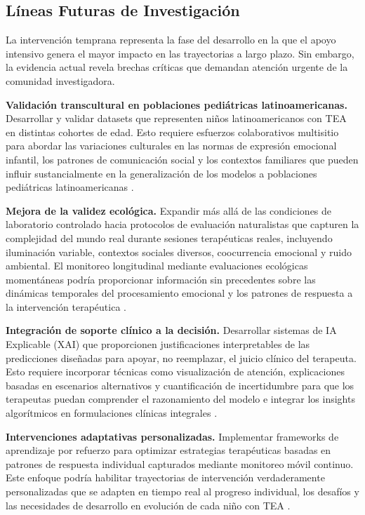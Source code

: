 \documentclass[ASNA,twocolumn]{USG}
\begin{document}
	\subsection{Líneas Futuras de Investigación}\label{sec7b}
	
	La intervención temprana representa la fase del desarrollo en la que el apoyo
	intensivo genera el mayor impacto en las trayectorias a largo plazo. Sin embargo,
	la evidencia actual revela brechas críticas que demandan atención urgente de la
	comunidad investigadora.
	
	\textbf{Validación transcultural en poblaciones pediátricas latinoamericanas.}
	Desarrollar y validar datasets que representen niños latinoamericanos con TEA en
	distintas cohortes de edad. Esto requiere esfuerzos colaborativos multisitio para
	abordar las variaciones culturales en las normas de expresión emocional infantil,
	los patrones de comunicación social y los contextos familiares que pueden influir
	sustancialmente en la generalización de los modelos a poblaciones pediátricas
	latinoamericanas \cite{Shaik2025,Washington2022}.
	
	\textbf{Mejora de la validez ecológica.} Expandir más allá de las condiciones de
	laboratorio controlado hacia protocolos de evaluación naturalistas que capturen la
	complejidad del mundo real durante sesiones terapéuticas reales, incluyendo
	iluminación variable, contextos sociales diversos, coocurrencia emocional y ruido
	ambiental. El monitoreo longitudinal mediante evaluaciones ecológicas momentáneas
	podría proporcionar información sin precedentes sobre las dinámicas temporales del
	procesamiento emocional y los patrones de respuesta a la intervención terapéutica
	\cite{Johnson2025,Rudovic2018}.
	
	\textbf{Integración de soporte clínico a la decisión.} Desarrollar sistemas de IA
	Explicable (XAI) que proporcionen justificaciones interpretables de las predicciones
	diseñadas para apoyar, no reemplazar, el juicio clínico del terapeuta. Esto requiere
	incorporar técnicas como visualización de atención, explicaciones basadas en
	escenarios alternativos y cuantificación de incertidumbre para que los terapeutas
	puedan comprender el razonamiento del modelo e integrar los insights algorítmicos
	en formulaciones clínicas integrales \cite{Rhatassi2024,Radocaj2025}.
	
	\textbf{Intervenciones adaptativas personalizadas.} Implementar frameworks de
	aprendizaje por refuerzo para optimizar estrategias terapéuticas basadas en patrones
	de respuesta individual capturados mediante monitoreo móvil continuo. Este enfoque
	podría habilitar trayectorias de intervención verdaderamente personalizadas que se
	adapten en tiempo real al progreso individual, los desafíos y las necesidades de
	desarrollo en evolución de cada niño con TEA \cite{Rudovic2019}.
	
\end{document}
